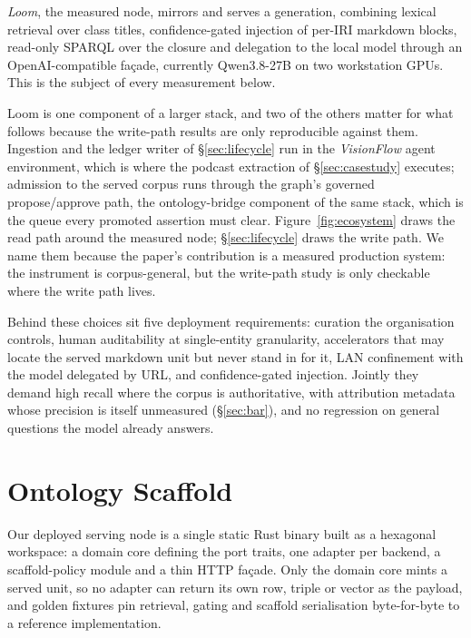\documentclass[10pt,twocolumn]{article}
\begin{document}
\emph{Loom}, the measured node, mirrors and serves a generation, combining lexical retrieval over class titles, confidence-gated injection of per-IRI markdown blocks, read-only SPARQL over the closure and delegation to the local model through an OpenAI-compatible fa\c{c}ade, currently Qwen3.8-27B on two workstation GPUs. This is the subject of every measurement below.

Loom is one component of a larger stack, and two of the others matter for what follows because the write-path results are only reproducible against them. Ingestion and the ledger writer of \S\ref{sec:lifecycle} run in the \emph{VisionFlow} agent environment, which is where the podcast extraction of \S\ref{sec:casestudy} executes; admission to the served corpus runs through the graph's governed propose/approve path, the ontology-bridge component of the same stack, which is the queue every promoted assertion must clear. Figure~\ref{fig:ecosystem} draws the read path around the measured node; \S\ref{sec:lifecycle} draws the write path. We name them because the paper's contribution is a measured production system: the instrument is corpus-general, but the write-path study is only checkable where the write path lives.

Behind these choices sit five deployment requirements: curation the organisation controls, human auditability at single-entity granularity, accelerators that may locate the served markdown unit but never stand in for it, LAN confinement with the model delegated by URL, and confidence-gated injection. Jointly they demand high recall where the corpus is authoritative, with attribution metadata whose precision is itself unmeasured (\S\ref{sec:bar}), and no regression on general questions the model already answers.




\section{Ontology Scaffold}\label{sec:system}
Our deployed serving node is a single static Rust binary built as a hexagonal workspace: a domain core defining the port traits, one adapter per backend, a scaffold-policy module and a thin HTTP façade. Only the domain core mints a served unit, so no adapter can return its own row, triple or vector as the payload, and golden fixtures pin retrieval, gating and scaffold serialisation byte-for-byte to a reference implementation.
\end{document}
